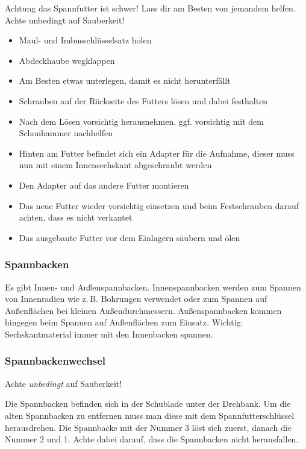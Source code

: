 \documentclass{\basedir/fablab-document}
\begin{document}
Achtung das Spannfutter ist schwer! Lass dir am Besten von jemandem helfen. Achte unbedingt auf Sauberkeit!
\begin{itemize}
\item Maul- und Imbusschlüsselsatz holen
\item Abdeckhaube wegklappen
\item Am Besten etwas unterlegen, damit es nicht herunterfällt
\item Schrauben auf der Rückseite des Futters lösen und dabei festhalten 
\item Nach dem Lösen vorsichtig herausnehmen, ggf. vorsichtig mit dem Schonhammer nachhelfen
\item Hinten am Futter befindet sich ein Adapter für die Aufnahme, dieser muss nun mit einem Innensechskant abgeschraubt werden
\item Den Adapter auf das andere Futter montieren
\item Das neue Futter wieder vorsichtig einsetzen und beim Festschrauben darauf achten, dass es nicht verkantet
\item Das ausgebaute Futter vor dem Einlagern säubern und ölen
\end{itemize}

\subsubsection{Spannbacken}

Es gibt Innen- und Außenspannbacken.
Innenspannbacken werden zum Spannen von Innenradien wie z.\,B. Bohrungen verwendet oder
zum Spannen auf Außenflächen bei kleinen Außendurchmessern.
Außenspannbacken kommen hingegen beim Spannen auf Außenflächen zum Einsatz.
Wichtig: Sechskantmaterial immer mit den Innenbacken spannen.


\subsubsection{Spannbackenwechsel}
\label{zerspanung:spannbackenwechsel}
Achte \emph{unbedingt} auf Sauberkeit!
 
Die Spannbacken befinden sich in der Schublade unter der Drehbank.
Um die alten Spannbacken zu entfernen muss man diese mit dem Spannfutterschlüssel herausdrehen.
Die Spannbacke mit der Nummer 3 löst sich zuerst, danach die Nummer 2 und 1.
Achte dabei darauf, dass die Spannbacken nicht herausfallen.
\end{document}
